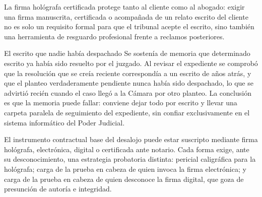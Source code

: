 \documentclass[12pt,oneside]{book}
\begin{document}
\begin{important}
La firma hológrafa certificada protege tanto al cliente como al abogado: exigir una firma manuscrita, certificada o acompañada de un relato escrito del cliente no es solo un requisito formal para que el tribunal acepte el escrito, sino también una herramienta de resguardo profesional frente a reclamos posteriores.
\end{important}

\begin{example}{El escrito que nadie había despachado}
Se sostenía de memoria que determinado escrito ya había sido resuelto por el juzgado. Al revisar el expediente se comprobó que la resolución que se creía reciente correspondía a un escrito de años atrás, y que el planteo verdaderamente pendiente nunca había sido despachado, lo que se advirtió recién cuando el caso llegó a la Cámara por otro planteo. La conclusión es que la memoria puede fallar: conviene dejar todo por escrito y llevar una carpeta paralela de seguimiento del expediente, sin confiar exclusivamente en el sistema informático del Poder Judicial.
\end{example}

\begin{important}
El instrumento contractual base del desalojo puede estar suscripto mediante firma hológrafa, electrónica, digital o certificada ante notario. Cada forma exige, ante su desconocimiento, una estrategia probatoria distinta: pericial caligráfica para la hológrafa; carga de la prueba en cabeza de quien invoca la firma electrónica; y carga de la prueba en cabeza de quien desconoce la firma digital, que goza de presunción de autoría e integridad.
\end{important}
\end{document}
